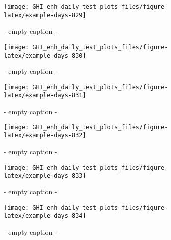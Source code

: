 \documentclass[
  10pt,
  a4paper,oneside]{article}
\begin{document}
\begin{figure}[H]

{\centering \texttt{[image: GHI\_enh\_daily\_test\_plots\_files/figure-latex/example-days-829]} 

}

\caption{ - empty caption - }\label{fig:example-days-829}
\end{figure}

\begin{figure}[H]

{\centering \texttt{[image: GHI\_enh\_daily\_test\_plots\_files/figure-latex/example-days-830]} 

}

\caption{ - empty caption - }\label{fig:example-days-830}
\end{figure}

\begin{figure}[H]

{\centering \texttt{[image: GHI\_enh\_daily\_test\_plots\_files/figure-latex/example-days-831]} 

}

\caption{ - empty caption - }\label{fig:example-days-831}
\end{figure}

\begin{figure}[H]

{\centering \texttt{[image: GHI\_enh\_daily\_test\_plots\_files/figure-latex/example-days-832]} 

}

\caption{ - empty caption - }\label{fig:example-days-832}
\end{figure}

\begin{figure}[H]

{\centering \texttt{[image: GHI\_enh\_daily\_test\_plots\_files/figure-latex/example-days-833]} 

}

\caption{ - empty caption - }\label{fig:example-days-833}
\end{figure}

\begin{figure}[H]

{\centering \texttt{[image: GHI\_enh\_daily\_test\_plots\_files/figure-latex/example-days-834]} 

}

\caption{ - empty caption - }\label{fig:example-days-834}
\end{figure}
\end{document}
